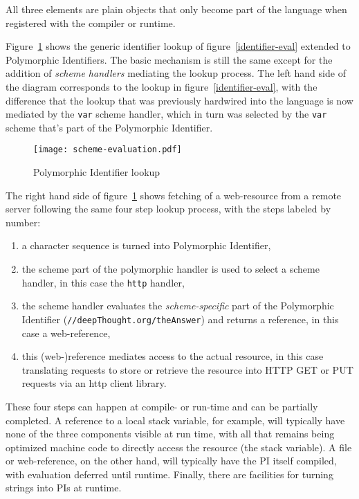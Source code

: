 \documentclass[preprint,authoryear]{llncs}
\begin{document}
All three elements are plain objects that only become part of the language when registered
with the compiler or runtime.

Figure~\ref{scheme-eval} shows the generic identifier lookup of figure~\ref{identifier-eval}
extended to Polymorphic Identifiers.  The basic mechanism is still the same except for the
addition of \emph{scheme handlers} mediating the lookup process.  The left hand side of the
diagram corresponds to the lookup in figure~\ref{identifier-eval}, with the difference that
the lookup that was previously hardwired into the language is now mediated by the {\tt var}
scheme handler, which in turn was selected by the {\tt var} scheme that's part of the 
Polymorphic Identifier.


\begin{figure}[htbp]
\begin{center}
\texttt{[image: scheme-evaluation.pdf]}
\caption{Polymorphic Identifier lookup}
\label{scheme-eval}
\end{center}
\end{figure}


The right hand side of figure~\ref{scheme-eval} shows fetching of a web-resource from
a remote server following the same four step lookup process, with the steps labeled by
number:

\begin{enumerate}
\item a character sequence is turned into  Polymorphic Identifier,
\item the scheme part of the polymorphic handler is used to select a scheme handler, in this case the {\tt http} handler,
\item the scheme handler evaluates the \emph{scheme-specific} part of the Polymorphic Identifier ({\tt //deepThought.org/theAnswer})
	 and returns a reference, in this case a web-reference,
\item this (web-)reference mediates access to the actual resource, in this case translating requests to store or retrieve the 
	resource into HTTP GET or PUT requests via an http client library.
\end{enumerate}

These four steps can happen at compile- or run-time and can be partially completed.
A reference to a local stack variable, for example, will typically have none of the
three components visible at run time, with all that remains being optimized 
machine code to directly access the resource (the stack variable).
A file or web-reference, on the other hand, will typically have the PI itself
compiled, with evaluation deferred until runtime.  Finally, there are facilities
for turning strings into PIs at runtime.
\end{document}
